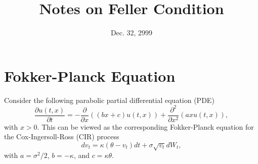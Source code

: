 \documentclass[12pt]{article}
\begin{document}
\title{Notes on Feller Condition}
\date{Dec. 32, 2999}

\maketitle

\section{Fokker-Planck Equation}

  Consider the following parabolic partial differential equation (PDE) \cite{Feller}
  \begin{equation}
    \frac{\partial u(t,x)}{\partial t} = -\frac{\partial}{\partial x}\left((bx+c)u(t,x)\right)
                                       + \frac{\partial^2}{\partial x^2}\left(axu(t,x)\right),
    \label{FP}
  \end{equation}
  with $x>0$. This can be viewed as the corresponding Fokker-Planck equation for the Cox-Ingersoll-Ross (CIR)
  process
  \begin{equation}
    \label{CIR}
    dv_t=\kappa(\theta-v_t)dt + \sigma\sqrt{v_t}dW_t,
  \end{equation}
  with $a=\sigma^2/2$, $b=-\kappa$, and $c=\kappa\theta$.
\end{document}
